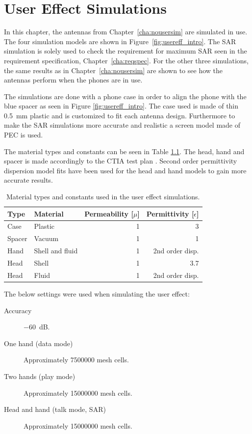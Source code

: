 \chapter{User Effect Simulations}
\label{cha:usereff}
In this chapter, the antennas from Chapter~\ref{cha:nousersim} are simulated in use.
The four simulation models are shown in Figure~\ref{fig:usereff_intro}. The SAR simulation is solely used to check the requirement for maximum SAR seen in the requirement specification, Chapter~\ref{cha:reqspec}. For the other three simulations, the same results as in Chapter~\ref{cha:nousersim} are shown to see how the antennas perform when the phones are in use.

The simulations are done with a phone case in order to align the phone with the blue spacer as seen in Figure \ref{fig:usereff_intro}. The case used is made of thin \SI{0.5}{mm} plastic and is customized to fit each antenna design. Furthermore to make the SAR simulations more accurate and realistic a screen model made of PEC is used.  

The material types and constants can be seen in Table \ref{tab:cst_material}. The head, hand and spacer is made accordingly to the CTIA test plan \cite{cita2015}. Second order permittivity dispersion model fits have been used for the head and hand models to gain more accurate results.

\begin{table}
  \centering
  \begin{tabular}{|l|l|r|r|}
    \hline
    Type & Material & Permeability [$\mu$] & Permittivity [$\epsilon$] \\
    \hline
    Case      & Plastic  & 1    & 3       \\
    Spacer    & Vacuum   & 1    & 1       \\
    Hand      & Shell and fluid   & 1    & 2nd order disp.     \\
    Head      & Shell    & 1    & 3.7     \\
    Head      & Fluid    & 1    & 2nd order disp.     \\ 
    \hline
  \end{tabular}
  \caption{Material types and constants used in the user effect simulations.}
  \label{tab:cst_material}
\end{table}

The below settings were used when simulating the user effect:
\begin{description}
\item[Accuracy] \SI{-60}{dB}.
\item[One hand (data mode)] Approximately \num{7500000} mesh cells.
\item[Two hands (play mode)] Approximately \num{15000000} mesh cells.
\item[Head and hand (talk mode, SAR)] Approximately \num{15000000} mesh cells.
\end{description}



